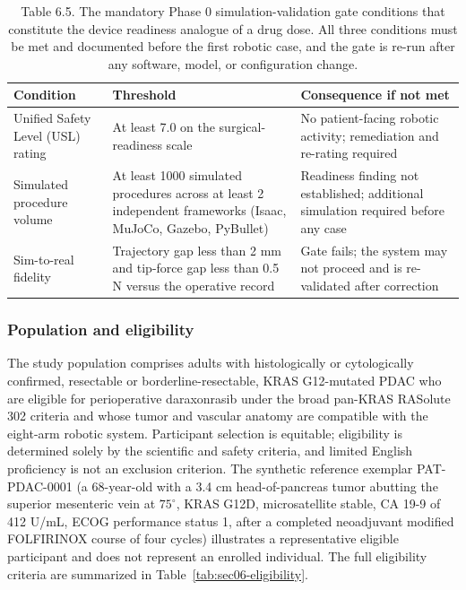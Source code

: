 \begin{table}[t]
\caption{Table 6.5. The mandatory Phase 0 simulation-validation gate conditions that
constitute the device readiness analogue of a drug dose. All three conditions must
be met and documented before the first robotic case, and the gate is re-run after
any software, model, or configuration change.}
\label{tab:sec06-phase0}
\centering
\begin{tabularx}{\textwidth}{L{4.0cm} L{4.6cm} Y}
\toprule
\textbf{Condition} & \textbf{Threshold} & \textbf{Consequence if not met} \\
\midrule
Unified Safety Level (USL) rating & At least 7.0 on the surgical-readiness scale & No patient-facing robotic activity; remediation and re-rating required \\
Simulated procedure volume & At least 1000 simulated procedures across at least 2 independent frameworks (Isaac, MuJoCo, Gazebo, PyBullet) & Readiness finding not established; additional simulation required before any case \\
Sim-to-real fidelity & Trajectory gap less than 2 mm and tip-force gap less than 0.5 N versus the operative record & Gate fails; the system may not proceed and is re-validated after correction \\
\bottomrule
\end{tabularx}
\end{table}

\subsubsection*{Population and eligibility}

The study population comprises adults with histologically or cytologically confirmed,
resectable or borderline-resectable, KRAS G12-mutated PDAC who are eligible for
perioperative daraxonrasib under the broad pan-KRAS RASolute 302 criteria and whose
tumor and vascular anatomy are compatible with the eight-arm robotic system.
Participant selection is equitable; eligibility is determined solely by the
scientific and safety criteria, and limited English proficiency is not an exclusion
criterion. The synthetic reference exemplar PAT-PDAC-0001 (a 68-year-old with a
3.4 cm head-of-pancreas tumor abutting the superior mesenteric vein at $75^\circ$,
KRAS G12D, microsatellite stable, CA 19-9 of 412 U/mL, ECOG performance status 1,
after a completed neoadjuvant modified FOLFIRINOX course of four cycles) illustrates
a representative eligible participant and does not represent an enrolled individual.
The full eligibility criteria are summarized in Table~\ref{tab:sec06-eligibility}.

